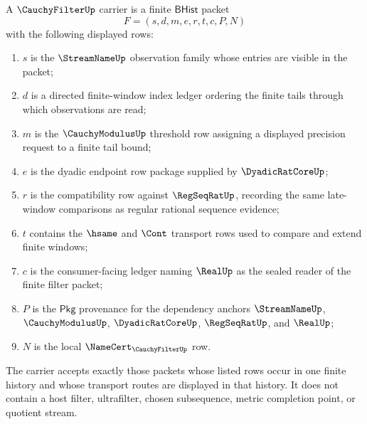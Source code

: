 \begin{definition}\label{def:cauchyfilter-carrier}
A $\CauchyFilterUp$ carrier is a finite $\mathsf{BHist}$ packet
$$
F=(s,d,m,e,r,t,c,P,N)
$$
with the following displayed rows:
\begin{enumerate}
\item $s$ is the $\StreamNameUp$ observation family whose entries are visible
in the packet;
\item $d$ is a directed finite-window index ledger ordering the finite tails
through which observations are read;
\item $m$ is the $\CauchyModulusUp$ threshold row assigning a displayed
precision request to a finite tail bound;
\item $e$ is the dyadic endpoint row package supplied by $\DyadicRatCoreUp$;
\item $r$ is the compatibility row against $\RegSeqRatUp$, recording the same
late-window comparisons as regular rational sequence evidence;
\item $t$ contains the $\hsame$ and $\Cont$ transport rows used to compare and
extend finite windows;
\item $c$ is the consumer-facing ledger naming $\RealUp$ as the sealed reader
of the finite filter packet;
\item $P$ is the $\mathsf{Pkg}$ provenance for the dependency anchors
$\StreamNameUp$, $\CauchyModulusUp$, $\DyadicRatCoreUp$, $\RegSeqRatUp$, and
$\RealUp$;
\item $N$ is the local $\NameCert_{\CauchyFilterUp}$ row.
\end{enumerate}
The carrier accepts exactly those packets whose listed rows occur in one
finite history and whose transport routes are displayed in that history. It
does not contain a host filter, ultrafilter, chosen subsequence, metric
completion point, or quotient stream.
\end{definition}

